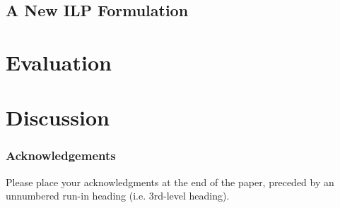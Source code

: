 \documentclass[runningheads]{llncs}
\begin{document}
\subsection{A New ILP Formulation}




\section{Evaluation}
\section{Discussion}



\subsubsection{Acknowledgements} Please place your acknowledgments at
the end of the paper, preceded by an unnumbered run-in heading (i.e.
3rd-level heading).

%
%
%


\end{document}
